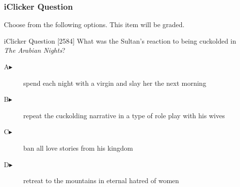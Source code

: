 \begin{frame}
  \frametitle{iClicker Question}
Choose from the following options. This item will be graded.
\begin{block}{iClicker Question}
[2584] What was the Sultan's reaction to being cuckolded in \emph{The Arabian
Nights}?
\end{block}
\begin{description}
\item[A\hspace{.2in}$\blacktriangleright$] spend each night with a virgin and slay her the next morning
\item[B\hspace{.2in}$\blacktriangleright$] repeat the cuckolding narrative in a type of role play with his wives
\item[C\hspace{.2in}$\blacktriangleright$] ban all love stories from his kingdom
\item[D\hspace{.2in}$\blacktriangleright$] retreat to the mountains in eternal hatred of women
\end{description}
\end{frame}
